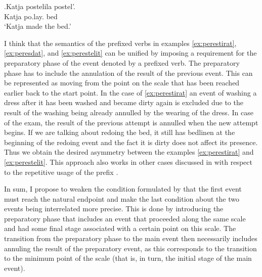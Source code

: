 \exg.\label{ex:postelit}Katja postelila postel'.\\
Katja po.lay. bed\\
\trans `Katja made the bed.'

I think that the semantics of the prefixed verbs in examples \ref{ex:perestirat}, \ref{ex:peresdat}, and \ref{ex:perestelit} can be unified by imposing a requirement for the preparatory phase of the event denoted by a prefixed verb. The preparatory phase has to include the annulation of the result of the previous event. This can be represented as moving from the point on the scale that has been reached earlier back to the start point. In the case of \ref{ex:perestirat} an event of washing a dress after it has been washed and became dirty again is excluded due to the result of the washing being already annulled by the wearing of the dress. In case of the exam, the result of the previous attempt is annulled when the new attempt begins. If we are talking about redoing the bed, it still has bedlinen at the beginning of the redoing event and the fact it is dirty does not affect its presence. Thus we obtain the desired asymmetry between the examples \ref{ex:perestirat} and \ref{ex:perestelit}. This approach also works in other cases discussed in \citealt{Kagan:book} with respect to the repetitive usage of the prefix .

In sum, I propose to weaken the condition formulated by \citet{Kagan:book} that the first event must reach the natural endpoint and make the last condition about the two events being interrelated more precise. This is done by introducing the preparatory phase that includes an event that proceeded along the same scale and had some final stage associated with a certain point on this scale. The transition from the preparatory phase to the main event then necessarily includes annuling the result of the preparatory event, as this corresponds to the transition to the minimum point of the scale (that is, in turn, the initial stage of the main event).

